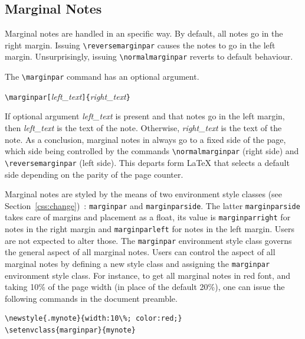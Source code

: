 \subsection{Marginal Notes}

%
%
%
\reversemarginpar%
\normalmarginpar%
Marginal notes are handled in an \hevea{} specific way.
By default, all notes go in the right margin.
Issuing \verb+\reversemarginpar+ causes the notes to go in the left
margin. Unsurprisingly, issuing \verb+\normalmarginpar+ reverts to
default behaviour.

The \verb+\marginpar+ command has an optional argument.
\begin{flushleft}
\quad\verb+\marginpar[+\textit{left\_text}\verb+]{+\textit{right\_text}\verb+}+
\end{flushleft}
If optional argument \textit{left\_text} is present and that notes
go in the left margin, then \textit{left\_text} is the text of the
note. Otherwise, \textit{right\_text} is the text of the note.
As a conclusion, marginal notes in \hevea{} always go to a fixed side
of the page, which side being controlled by the commands
\verb+\normalmarginpar+ (right side) and \verb+\reversemarginpar+
(left side). This departs form \LaTeX{} that selects a default side
depending on the parity of the page counter.

Marginal notes are styled by the means of two environment style
classes (see Section~\ref{css:change})~:
\verb+marginpar+ and \verb+marginparside+.
The latter \verb+marginparside+ takes care of margins and placement as
a float, its value is \verb+marginparright+ for notes in the right
margin and \verb+marginparleft+ for notes in the left margin.
Users are not expected to alter those.
The \verb+marginpar+ environment style class governs the general
aspect of all marginal notes.
Users can control the aspect of all marginal notes by defining a new
style class and assigning the \verb+marginpar+ environment style
class.
For instance, to get all marginal notes in red font,
and taking 10\% of the page width (in place of the default
20\%),
one can issue the following commands in the document preamble.
\begin{verbatim}
\newstyle{.mynote}{width:10\%; color:red;}
\setenvclass{marginpar}{mynote}
\end{verbatim}


